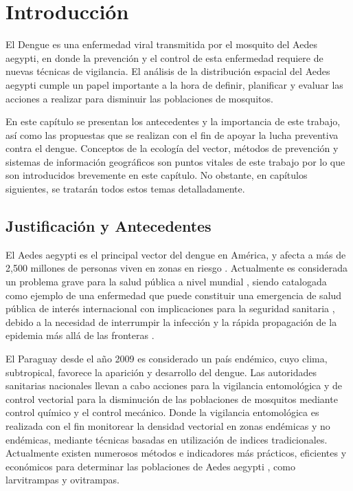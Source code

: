 \chapter{Introducción}

El Dengue es una enfermedad viral transmitida por el mosquito del Aedes aegypti, en donde la
prevención y el control de esta enfermedad requiere de nuevas técnicas de vigilancia. El análisis
de la distribución espacial del Aedes aegypti cumple un papel importante a la hora de definir,
planificar y evaluar las acciones a realizar para disminuir las poblaciones de mosquitos.

En este capítulo se presentan los antecedentes y la importancia de este trabajo, así como las
propuestas que se realizan con el fin de apoyar la lucha preventiva contra el dengue. Conceptos de
la ecología del vector, métodos de prevención y sistemas de información geográficos son puntos
vitales de este trabajo por lo que son introducidos brevemente en este capítulo. No obstante, en
capítulos siguientes, se tratarán todos estos temas detalladamente.

\section{Justificación y Antecedentes}
El Aedes aegypti es el principal vector del dengue en América, y afecta a más de 2,500 millones
de personas viven en zonas en riesgo \cite{world2009dengue, gustavo2006dengue}. Actualmente es
considerada un problema grave para la salud pública a nivel mundial
\cite{dengueUruguayCap1, world2009dengue, DIBO2005}, siendo catalogada como ejemplo de una
enfermedad que puede constituir una emergencia de salud pública de interés internacional con
implicaciones para la seguridad sanitaria \cite{dengueUruguayCap1, world2009dengue}, debido a la
necesidad de interrumpir la infección y la rápida propagación de la epidemia más allá de las
fronteras \cite{world2009dengue}.

El Paraguay desde el año 2009 es considerado un país endémico, cuyo clima, subtropical, favorece
la aparición y desarrollo del dengue. Las autoridades sanitarias nacionales llevan a cabo
acciones para la vigilancia entomológica y de control vectorial para la disminución de las
poblaciones de mosquitos mediante control químico y el control mecánico. Donde la vigilancia entomológica es realizada con el fin monitorear la densidad vectorial en zonas endémicas y no
endémicas, mediante técnicas basadas en utilización de indices tradicionales. Actualmente existen
numerosos métodos e indicadores más prácticos, eficientes y económicos para determinar las
poblaciones de Aedes aegypti \cite{cenaprece2013}, como larvitrampas y ovitrampas.

